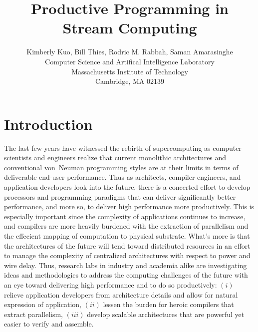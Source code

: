 \documentclass[11pt, letterpaper, onecolumn]{article}
\date{}
\title {\bf Productive Programming in Stream Computing}
\author{
  Kimberly Kuo, Bill Thies, Rodric M. Rabbah, Saman Amarasinghe\\
  Computer Science and Artifical Intelligence Laboratory\\
  Massachusetts Institute of Technology\\
  Cambridge, MA 02139
}
\begin{document}
\maketitle

\singlespacing
\begin{abstract}
\end{abstract}

\doublespacing


\section{Introduction}

The last  few years  have witnessed the  rebirth of  supercomputing as
computer  scientists  and engineers  realize  that current  monolithic
architectures  and conventional von~Neuman  programming styles  are at
their  limits in terms  of deliverable  end-user performance.  Thus as
architects, compiler  engineers, and application  developers look into
the  future, there  is a  concerted effort  to develop  processors and
programming   paradigms   that   can  deliver   significantly   better
performance,   and  more   so,  to   deliver  high   performance  more
productively.  This is  especially important  since the  complexity of
applications  continues to  increase, and  compilers are  more heavily
burdened with the extraction  of parallelism and the effecient mapping
of  computation  to  physical  substrate.  What's  more  is  that  the
architectures of the future  will tend toward distributed resources in
an effort  to manage the complexity of  centralized architectures with
respect to power  and wire delay. Thus, research  labs in industry and
academia alike  are investigating  ideas and methodologies  to address
the computing challenges  of the future with an  eye toward delivering
high performance and to  do so productively: $(i)$ relieve application
developers from architecture details  and allow for natural expression
of  application, $(ii)$ lessen  the burden  for heroic  compilers that
extract parallelism,  $(iii)$ develop scalable  architectures that are
powerful yet easier to verify and assemble.
\end{document}

